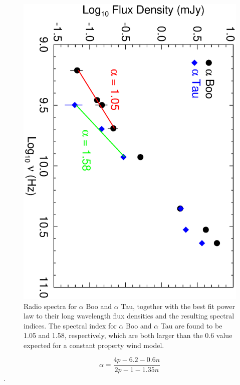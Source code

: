 \documentclass[iop]{emulateapj}
\begin{document}
\begin{figure}
\includegraphics[trim = 0mm 0mm 0mm 10mm, clip,scale=0.385,angle=90]{fig3.ps}
\caption{Radio spectra for $\alpha$ Boo and $\alpha$ Tau, together with the best fit power law to their long wavelength flux densities and the resulting spectral indices. The spectral index for $\alpha$ Boo and $\alpha$ Tau are found to be 1.05 and 1.58, respectively, which are both larger than the 0.6 value expected for a constant property wind model.}
\label{fig:fig3}
\end{figure}

\begin{equation}
\alpha = \frac{4p -6.2 -0.6n}{2p-1-1.35n}
\label{eq:eq1}
\end{equation}
\citep[e.g.,][]{1987ApJ...312..813S}. 
\end{document}
